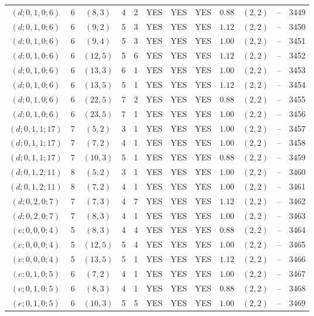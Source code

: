 \begin{longtable}{|c|c|c|c|c|c|c|c|c|c|c|c|}
$(d;0,1,0;6)$ & 6 & $(8,3)$ & 4 & 2 & YES & YES & YES & $0.88$ & $(2,2)$ & -- & 3449\\
$(d;0,1,0;6)$ & 6 & $(9,2)$ & 5 & 3 & YES & YES & YES & $1.12$ & $(2,2)$ & -- & 3450\\
$(d;0,1,0;6)$ & 6 & $(9,4)$ & 5 & 3 & YES & YES & YES & $1.00$ & $(2,2)$ & -- & 3451\\
$(d;0,1,0;6)$ & 6 & $(12,5)$ & 5 & 6 & YES & YES & YES & $1.12$ & $(2,2)$ & -- & 3452\\
$(d;0,1,0;6)$ & 6 & $(13,3)$ & 6 & 1 & YES & YES & YES & $1.00$ & $(2,2)$ & -- & 3453\\
$(d;0,1,0;6)$ & 6 & $(13,5)$ & 5 & 1 & YES & YES & YES & $1.12$ & $(2,2)$ & -- & 3454\\
$(d;0,1,0;6)$ & 6 & $(22,5)$ & 7 & 2 & YES & YES & YES & $0.88$ & $(2,2)$ & -- & 3455\\
$(d;0,1,0;6)$ & 6 & $(23,5)$ & 7 & 1 & YES & YES & YES & $1.00$ & $(2,2)$ & -- & 3456\\
$(d;0,1,1;17)$ & 7 & $(5,2)$ & 3 & 1 & YES & YES & YES & $1.00$ & $(2,2)$ & -- & 3457\\
$(d;0,1,1;17)$ & 7 & $(7,2)$ & 4 & 1 & YES & YES & YES & $1.00$ & $(2,2)$ & -- & 3458\\
$(d;0,1,1;17)$ & 7 & $(10,3)$ & 5 & 1 & YES & YES & YES & $0.88$ & $(2,2)$ & -- & 3459\\
$(d;0,1,2;11)$ & 8 & $(5,2)$ & 3 & 1 & YES & YES & YES & $1.00$ & $(2,2)$ & -- & 3460\\
$(d;0,1,2;11)$ & 8 & $(7,2)$ & 4 & 1 & YES & YES & YES & $1.00$ & $(2,2)$ & -- & 3461\\
$(d;0,2,0;7)$ & 7 & $(7,3)$ & 4 & 7 & YES & YES & YES & $1.12$ & $(2,2)$ & -- & 3462\\
$(d;0,2,0;7)$ & 7 & $(8,3)$ & 4 & 1 & YES & YES & YES & $1.00$ & $(2,2)$ & -- & 3463\\
$(e;0,0,0;4)$ & 5 & $(8,3)$ & 4 & 4 & YES & YES & YES & $0.88$ & $(2,2)$ & -- & 3464\\
$(e;0,0,0;4)$ & 5 & $(12,5)$ & 5 & 4 & YES & YES & YES & $1.00$ & $(2,2)$ & -- & 3465\\
$(e;0,0,0;4)$ & 5 & $(13,5)$ & 5 & 1 & YES & YES & YES & $1.12$ & $(2,2)$ & -- & 3466\\
$(e;0,1,0;5)$ & 6 & $(7,2)$ & 4 & 1 & YES & YES & YES & $1.00$ & $(2,2)$ & -- & 3467\\
$(e;0,1,0;5)$ & 6 & $(8,3)$ & 4 & 1 & YES & YES & YES & $0.88$ & $(2,2)$ & -- & 3468\\
$(e;0,1,0;5)$ & 6 & $(10,3)$ & 5 & 5 & YES & YES & YES & $1.00$ & $(2,2)$ & -- & 3469\\

\end{longtable}
